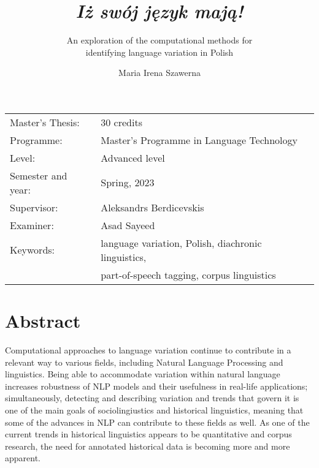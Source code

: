 \documentclass[12pt, a4paper]{article}  %
\title{\textit{Iż swój język mają!}}
\subtitle{An exploration of the computational methods for \\ identifying language variation in Polish}
\author{Maria Irena Szawerna}
\begin{document}
\begin{titlepage}

\maketitle

\vfill

\begingroup
\renewcommand*{\arraystretch}{1.2}
\begin{tabular}{l@{\hskip 20mm}l}
\hline
Master's Thesis: & 30 credits \\
Programme: & Master’s Programme in Language Technology\\
Level: & Advanced level \\
Semester and year: & Spring, 2023 \\
Supervisor: & Aleksandrs Berdicevskis \\
Examiner: & Asad Sayeed \\ %
Keywords: & language variation, Polish, diachronic linguistics, \\ 
{} & part-of-speech tagging, corpus linguistics %
\end{tabular}
\endgroup

\thispagestyle{empty}
\end{titlepage}

\newpage
\singlespacing
\section*{Abstract}

Computational approaches to language variation continue to contribute in a relevant way to various fields, including Natural Language Processing and linguistics. Being able to accommodate variation within natural language increases robustness of NLP models and their usefulness in real-life applications; simultaneously, detecting and describing variation and trends that govern it is one of the main goals of sociolingiustics and historical linguistics, meaning that some of the advances in NLP can contribute to these fields as well. As one of the current trends in historical linguistics appears to be quantitative and corpus research, the need for annotated historical data is becoming more and more apparent.
\end{document}
